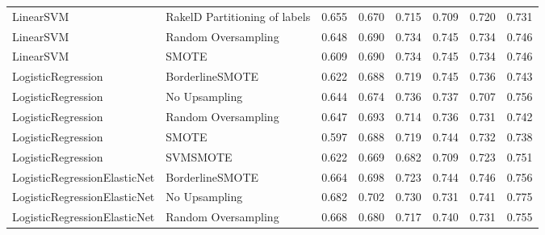\begin{tabular}{llllllll}
                      LinearSVM & RakelD Partitioning of labels & 0.655 &                     0.670 &                 0.715 &                  0.709 &                                   0.720 &    0.731 \\
                      LinearSVM &           Random Oversampling & 0.648 &                     0.690 &                 0.734 &                  0.745 &                                   0.734 &    0.746 \\
                      LinearSVM &                         SMOTE & 0.609 &                     0.690 &                 0.734 &                  0.745 &                                   0.734 &    0.746 \\
             LogisticRegression &               BorderlineSMOTE & 0.622 &                     0.688 &                 0.719 &                  0.745 &                                   0.736 &    0.743 \\
             LogisticRegression &                 No Upsampling & 0.644 &                     0.674 &                 0.736 &                  0.737 &                                   0.707 &    0.756 \\
             LogisticRegression &           Random Oversampling & 0.647 &                     0.693 &                 0.714 &                  0.736 &                                   0.731 &    0.742 \\
             LogisticRegression &                         SMOTE & 0.597 &                     0.688 &                 0.719 &                  0.744 &                                   0.732 &    0.738 \\
             LogisticRegression &                      SVMSMOTE & 0.622 &                     0.669 &                 0.682 &                  0.709 &                                   0.723 &    0.751 \\
   LogisticRegressionElasticNet &               BorderlineSMOTE & 0.664 &                     0.698 &                 0.723 &                  0.744 &                                   0.746 &    0.756 \\
   LogisticRegressionElasticNet &                 No Upsampling & 0.682 &                     0.702 &                 0.730 &                  0.731 &                                   0.741 &    0.775 \\
   LogisticRegressionElasticNet &           Random Oversampling & 0.668 &                     0.680 &                 0.717 &                  0.740 &                                   0.731 &    0.755 \\

\end{tabular}
